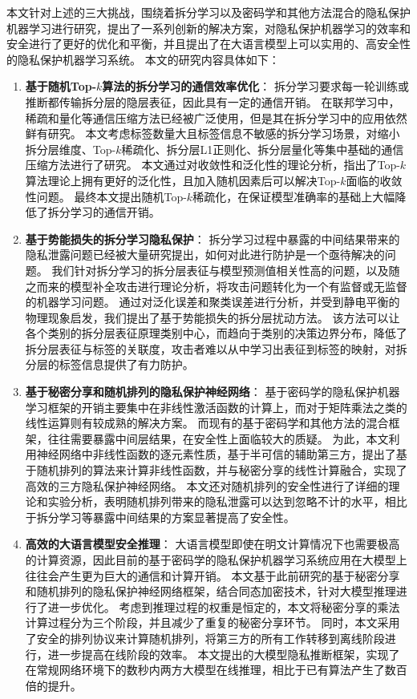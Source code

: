 本文针对上述的三大挑战，围绕着拆分学习以及密码学和其他方法混合的隐私保护机器学习进行研究，提出了一系列创新的解决方案，对隐私保护机器学习的效率和安全进行了更好的优化和平衡，并且提出了在大语言模型上可以实用的、高安全性的隐私保护机器学习系统。
%
本文的研究内容具体如下：
%
\begin{enumerate}[label={(\arabic*)}]
    \item \textbf{基于随机Top-$k$算法的拆分学习的通信效率优化}：
    拆分学习要求每一轮训练或推断都传输拆分层的隐层表征，因此具有一定的通信开销。
    在联邦学习中，稀疏和量化等通信压缩方法已经被广泛使用，但是其在拆分学习中的应用依然鲜有研究。
    本文考虑标签数量大且标签信息不敏感的拆分学习场景，对缩小拆分层维度、Top-$k$稀疏化、拆分层L1正则化、拆分层量化等集中基础的通信压缩方法进行了研究。
    本文通过对收敛性和泛化性的理论分析，指出了Top-$k$算法理论上拥有更好的泛化性，且加入随机因素后可以解决Top-$k$面临的收敛性问题。
    最终本文提出随机Top-$k$稀疏化，在保证模型准确率的基础上大幅降低了拆分学习的通信开销。
    
    \item \textbf{基于势能损失的拆分学习隐私保护}：
    拆分学习过程中暴露的中间结果带来的隐私泄露问题已经被大量研究提出，如何对此进行防护是一个亟待解决的问题。
    我们针对拆分学习的拆分层表征与模型预测值相关性高的问题，以及随之而来的模型补全攻击进行理论分析，将攻击问题转化为一个有监督或无监督的机器学习问题。
    通过对泛化误差和聚类误差进行分析，并受到静电平衡的物理现象启发，我们提出了基于势能损失的拆分层扰动方法。
    该方法可以让各个类别的拆分层表征原理类别中心，而趋向于类别的决策边界分布，降低了拆分层表征与标签的关联度，攻击者难以从中学习出表征到标签的映射，对拆分层的标签信息提供了有力防护。

    \item \textbf{基于秘密分享和随机排列的隐私保护神经网络}：
    基于密码学的隐私保护机器学习框架的开销主要集中在非线性激活函数的计算上，而对于矩阵乘法之类的线性运算则有较成熟的解决方案。
    而现有的基于密码学和其他方法的混合框架，往往需要暴露中间层结果，在安全性上面临较大的质疑。
    为此，本文利用神经网络中非线性函数的逐元素性质，基于半可信的辅助第三方，提出了基于随机排列的算法来计算非线性函数，并与秘密分享的线性计算融合，实现了高效的三方隐私保护神经网络。
    本文还对随机排列的安全性进行了详细的理论和实验分析，表明随机排列带来的隐私泄露可以达到忽略不计的水平，相比于拆分学习等暴露中间结果的方案显著提高了安全性。
 
    \item \textbf{高效的大语言模型安全推理}：
    大语言模型即使在明文计算情况下也需要极高的计算资源，因此目前的基于密码学的隐私保护机器学习系统应用在大模型上往往会产生更为巨大的通信和计算开销。
    本文基于此前研究的基于秘密分享和随机排列的隐私保护神经网络框架，结合同态加密技术，针对大模型推理进行了进一步优化。
    考虑到推理过程的权重是恒定的，本文将秘密分享的乘法计算过程分为三个阶段，并且减少了重复的秘密分享环节。
    同时，本文采用了安全的排列协议来计算随机排列，将第三方的所有工作转移到离线阶段进行，进一步提高在线阶段的效率。
    本文提出的大模型隐私推断框架，实现了在常规网络环境下的数秒内两方大模型在线推理，相比于已有算法产生了数百倍的提升。
\end{enumerate}